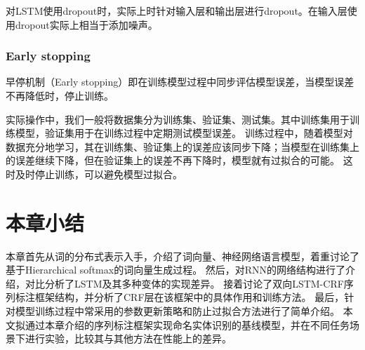 对LSTM使用dropout时，实际上时针对输入层和输出层进行dropout。在输入层使用dropout实际上相当于添加噪声。
\subsubsection{Early stopping}
早停机制（Early stopping）即在训练模型过程中同步评估模型误差，当模型误差不再降低时，停止训练。

实际操作中，我们一般将数据集分为训练集、验证集、测试集。其中训练集用于训练模型，验证集用于在训练过程中定期测试模型误差。
训练过程中，随着模型对数据充分地学习，其在训练集、验证集上的误差应该同步下降；当模型在训练集上的误差继续下降，但在验证集上的误差不再下降时，模型就有过拟合的可能。
这时及时停止训练，可以避免模型过拟合。
\section{本章小结}
本章首先从词的分布式表示入手，介绍了词向量、神经网络语言模型，着重讨论了基于Hierarchical softmax的词向量生成过程。
然后，对RNN的网络结构进行了介绍，对比分析了LSTM及其多种变体的实现差异。
接着讨论了双向LSTM-CRF序列标注框架结构，并分析了CRF层在该框架中的具体作用和训练方法。
最后，针对模型训练过程中常采用的参数更新策略和防止过拟合方法进行了简单介绍。
本文拟通过本章介绍的序列标注框架实现命名实体识别的基线模型，并在不同任务场景下进行实验，比较其与其他方法在性能上的差异。


